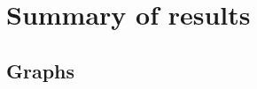 \documentclass[thesis=M,english]{FITthesis}[2018/05/30]
\begin{document}
\section{Summary of results}
\subsection{Graphs}
%	
\end{document}
